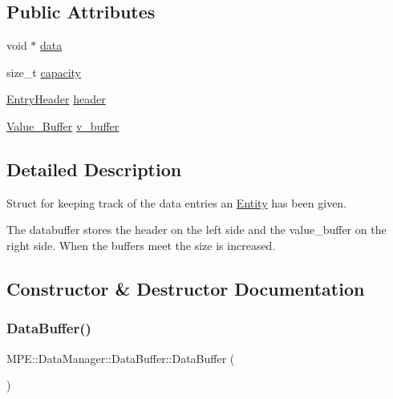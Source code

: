 \subsection*{Public Attributes}
\begin{DoxyCompactItemize}
\item 
void $\ast$ \hyperlink{struct_m_p_e_1_1_data_manager_1_1_data_buffer_afc54918e931e50e7b6491deb34aaad42}{data}
\item 
size\+\_\+t \hyperlink{struct_m_p_e_1_1_data_manager_1_1_data_buffer_ae239cb6309b020933fb4d158e7237a66}{capacity}
\item 
\hyperlink{struct_m_p_e_1_1_data_manager_1_1_entry_header}{Entry\+Header} \hyperlink{struct_m_p_e_1_1_data_manager_1_1_data_buffer_a392083d42f4f007a4c58dc2dd722d7f4}{header}
\item 
\hyperlink{struct_m_p_e_1_1_data_manager_1_1_value___buffer}{Value\+\_\+\+Buffer} \hyperlink{struct_m_p_e_1_1_data_manager_1_1_data_buffer_a27dfc55c4ae7fa07df7011e6232b982a}{v\+\_\+buffer}
\end{DoxyCompactItemize}


\subsection{Detailed Description}
Struct for keeping track of the data entries an \hyperlink{struct_m_p_e_1_1_entity}{Entity} has been given. 

The databuffer stores the header on the left side and the value\+\_\+buffer on the right side. When the buffers meet the size is increased. 

\subsection{Constructor \& Destructor Documentation}
\mbox{\label{struct_m_p_e_1_1_data_manager_1_1_data_buffer_a85b5e0404f7e7bd6a2e8553e4977fcf6}} 
\subsubsection{\texorpdfstring{Data\+Buffer()}{DataBuffer()}}
{\footnotesize\ttfamily M\+P\+E\+::\+Data\+Manager\+::\+Data\+Buffer\+::\+Data\+Buffer (\begin{DoxyParamCaption}{ }\end{DoxyParamCaption})}

